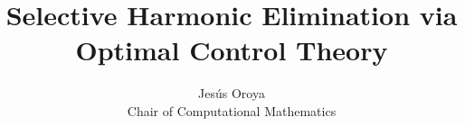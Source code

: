 \documentclass[a4paper]{article}
\title{Selective Harmonic Elimination via Optimal Control Theory}
\author{Jesús Oroya \\ Chair of Computational Mathematics}
\begin{document}
\maketitle

\begin{abstract}
    
\end{abstract}





\newpage
\appendix



 


\end{document}
